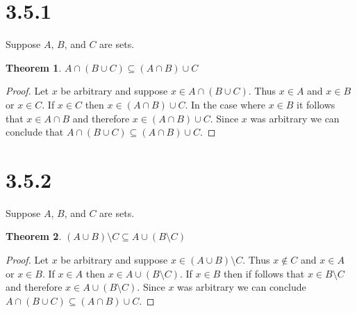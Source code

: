 \documentclass{article}
\newtheorem*{theorem}{Theorem}  %
\begin{document}
\section*{3.5.1}
Suppose $A$, $B$, and $C$ are sets.

\begin{theorem} $A \cap ( B \cup C ) \subseteq ( A \cap B ) \cup C $
\end{theorem}
\begin{proof}
Let $x$ be arbitrary and suppose $x \in A \cap ( B \cup C )$. Thus $x \in A$ and $x \in B$ or $x \in C$. If $x \in C$ then $x \in ( A \cap B ) \cup C$. In the case where $x \in B$ it follows that $x \in A \cap B$ and therefore $x \in ( A \cap B ) \cup C$. Since $x$ was arbitrary we can conclude that $A \cap ( B \cup C ) \subseteq ( A \cap B ) \cup C $.
\end{proof}

\section*{3.5.2}
Suppose $A$, $B$, and $C$ are sets.

\begin{theorem} $(A \cup B) \setminus C \subseteq A \cup (B \setminus C)$
\end{theorem}
\begin{proof}
Let $x$ be arbitrary and suppose $x \in ( A \cup B ) \setminus C$. Thus $x \notin C$ and $x \in A$ or $x \in B$. If $x \in A$ then $x \in A \cup ( B \setminus C )$. If $x \in B$ then if follows that $x \in B \setminus C$ and therefore $x \in A \cup ( B \setminus C )$. Since $x$ was arbitrary we can conclude $A \cap ( B \cup C ) \subseteq ( A \cap B ) \cup C$.
\end{proof}
\end{document}
